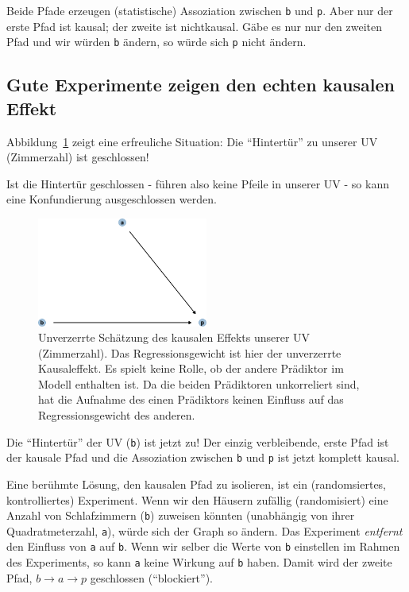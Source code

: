 \documentclass[
  a4paper,
  DIV=11]{scrreprt}
\theoremstyle{definition}
\theoremstyle{remark}
\begin{document}
Beide Pfade erzeugen (statistische) Assoziation zwischen \texttt{b} und
\texttt{p}. Aber nur der erste Pfad ist kausal; der zweite ist
nichtkausal. Gäbe es nur nur den zweiten Pfad und wir würden \texttt{b}
ändern, so würde sich \texttt{p} nicht ändern.

\hypertarget{gute-experimente-zeigen-den-echten-kausalen-effekt}{%
\subsection{Gute Experimente zeigen den echten kausalen
Effekt}\label{gute-experimente-zeigen-den-echten-kausalen-effekt}}

Abbildung~\ref{fig-dag-tuer-zu} zeigt eine erfreuliche Situation: Die
``Hintertür'' zu unserer UV (Zimmerzahl) ist geschlossen!

Ist die Hintertür geschlossen - führen also keine Pfeile in unserer UV -
so kann eine Konfundierung ausgeschlossen werden.

\begin{figure}

{\centering \includegraphics[width=0.5\textwidth,height=\textheight]{./kausal_files/figure-pdf/fig-dag-tuer-zu-1.pdf}

}

\caption{\label{fig-dag-tuer-zu}Unverzerrte Schätzung des kausalen
Effekts unserer UV (Zimmerzahl). Das Regressionsgewicht ist hier der
unverzerrte Kausaleffekt. Es spielt keine Rolle, ob der andere Prädiktor
im Modell enthalten ist. Da die beiden Prädiktoren unkorreliert sind,
hat die Aufnahme des einen Prädiktors keinen Einfluss auf das
Regressionsgewicht des anderen.}

\end{figure}

Die ``Hintertür'' der UV (\texttt{b}) ist jetzt zu! Der einzig
verbleibende, erste Pfad ist der kausale Pfad und die Assoziation
zwischen \texttt{b} und \texttt{p} ist jetzt komplett kausal.

Eine berühmte Lösung, den kausalen Pfad zu isolieren, ist ein
(randomsiertes, kontrolliertes) Experiment. Wenn wir den Häusern
zufällig (randomisiert) eine Anzahl von Schlafzimmern (\texttt{b})
zuweisen könnten (unabhängig von ihrer Quadratmeterzahl, \texttt{a}),
würde sich der Graph so ändern. Das Experiment \emph{entfernt} den
Einfluss von \texttt{a} auf \texttt{b}. Wenn wir selber die Werte von
\texttt{b} einstellen im Rahmen des Experiments, so kann \texttt{a}
keine Wirkung auf \texttt{b} haben. Damit wird der zweite Pfad,
\(b \rightarrow a \rightarrow p\) geschlossen (``blockiert'').
\end{document}

